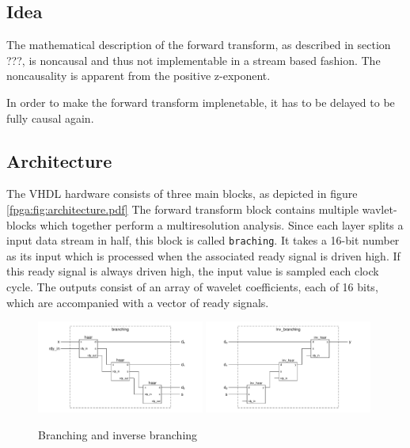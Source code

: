 \begin{refsection}
\subsection{Idea}


The mathematical description of the forward transform, as described in section ???, %
is noncausal and thus not implementable in a stream based fashion.
The noncausality is apparent from the positive z-exponent. %


In order to make the forward transform implenetable, it has to be delayed to be fully causal again.


\subsection{Architecture}

The VHDL hardware consists of three main blocks, as depicted in figure \ref{fpga:fig:architecture.pdf}
The forward transform block contains multiple wavlet-blocks which together perform a multiresolution analysis.
Since each layer splits a input data stream in half, this block is called \texttt{braching}.
It takes a 16-bit number as its input which is processed when the associated ready signal is driven high.
If this ready signal is always driven high, the input value is sampled each clock cycle.
The outputs consist of an array of wavelet coefficients, each of 16 bits, which are accompanied with a vector of ready signals. 

\begin{figure}
	\includegraphics[width=0.49\textwidth]{images/branching.pdf}
	\includegraphics[width=0.49\textwidth]{images/inv_branching.pdf}
	\caption{Branching and inverse branching \label{fpga:fig:architecture}}
\end{figure}


\end{refsection}
